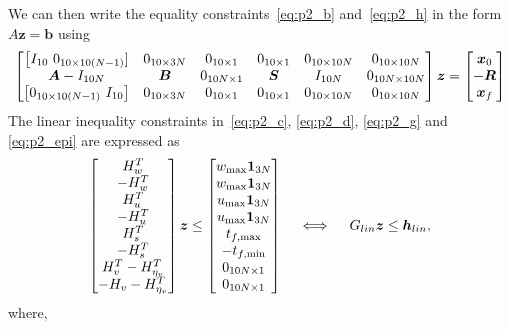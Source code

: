 \documentclass[10pt]{article}
\begin{document}
We can then write the equality constraints~\eqref{eq:p2_b} and~\eqref{eq:p2_h} in the form $A \bm{z} = \bm{b}$ using
\begin{equation}
\begin{bmatrix}
\big[ I_{10} \ 0_{10 \times 10(N-1)}] & 0_{10 \times 3N} & 0_{10 \times 1} & 0_{10 \times 1} & 0_{10 \times 10N} & 0_{10 \times 10N} \\
\bm{A} - I_{10N} & \bm{B} & 0_{10N \times 1} & \bm{S} & I_{10N} & 0_{10N \times 10N} \\
\big[ 0_{10 \times 10(N-1)} \ I_{10} \big] & 0_{10 \times 3N} & 0_{10 \times 1} & 0_{10 \times 1} & 0_{10 \times 10N} & 0_{10 \times 10N}
\end{bmatrix} \bm{z} = \begin{bmatrix}
\bm{x}_0 \\ -\bm{R} \\ \bm{x}_f
\end{bmatrix}
\label{eq:std_equality}
\end{equation}
The linear inequality constraints in~\eqref{eq:p2_c}, \eqref{eq:p2_d}, \eqref{eq:p2_g} and \eqref{eq:p2_epi} are expressed as
\begin{equation}
\begin{bmatrix}
H_w^T \\ - H_w^T \\ H_u^T \\ - H_u^T \\ H_s^T \\ - H_s^T \\ H_v^T - H_{\eta_v}^T \\ -H_v - H_{\eta_v}^T
\end{bmatrix} \bm{z} \leq \begin{bmatrix}
w_{\max} \bm{1}_{3N} \\ w_{\max} \bm{1}_{3N} \\ u_{\max} \bm{1}_{3N} \\ u_{\max} \bm{1}_{3N} \\ t_{f,\max} \\ -t_{f,\min} \\ 0_{10N \times 1} \\ 0_{10N \times 1}
\end{bmatrix} \quad \iff \quad G_{lin} \bm{z} \leq \bm{h}_{lin},
\label{eq:std_ineq_lin}
\end{equation}
where,
\end{document}
